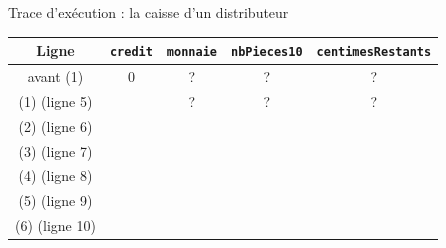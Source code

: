 \begin{UPSTIexercice}{Trace d'exécution : la caisse d'un distributeur}
    \begin{center}
        \begin{tabular}{|c|c|c|c|c|}
            \hline
            \textbf{Ligne} & \texttt{credit} & \texttt{monnaie} & \texttt{nbPieces10} & \texttt{centimesRestants} \\
            \hline
            avant (1)      & 0               & ?                & ?                   & ?                         \\
            \hline
            (1) (ligne 5)  &               & ?                & ?                   & ?                         \\[0.5cm]
            \hline
            (2) (ligne 6)  &                 &                  &                     &                           \\[0.5cm]
            \hline
            (3) (ligne 7)  &                 &                  &                     &                           \\[0.5cm]
            \hline
            (4) (ligne 8)  &                 &                  &                     &                           \\[0.5cm]
            \hline
            (5) (ligne 9)  &                 &                  &                     &                           \\[0.5cm]
            \hline
            (6) (ligne 10) &                 &                  &                     &                           \\[0.5cm]
            \hline
        \end{tabular}
    \end{center}
\end{UPSTIexercice}

